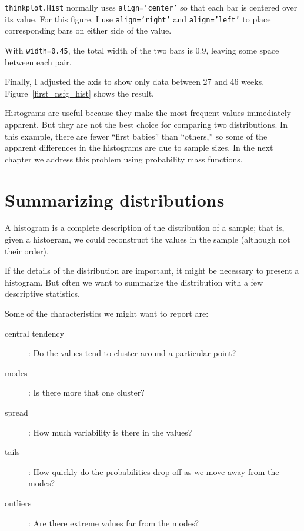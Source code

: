 \documentclass[12pt]{book}
\begin{document}
{\tt thinkplot.Hist} normally uses {\tt align='center'} so that
each bar is centered over its value.  For this figure, I use
{\tt align='right'} and {\tt align='left'} to place
corresponding bars on either side of the value.

With {\tt width=0.45}, the total width of the two bars is 0.9,
leaving some space between each pair.

Finally, I adjusted the axis to show only data between 27 and 46 weeks.
Figure~\ref{first_nsfg_hist} shows the result.

Histograms are useful because they make the most frequent values
immediately apparent.  But they are not the best choice for comparing
two distributions.  In this example, there are fewer ``first babies''
than ``others,'' so some of the apparent differences in the histograms
are due to sample sizes.  In the next chapter we address this problem
using probability mass functions.


\section{Summarizing distributions}
\label{mean}

A histogram is a complete description of the distribution of a sample;
that is, given a histogram, we could reconstruct the values in the
sample (although not their order).

If the details of the distribution are important, it might be
necessary to present a histogram.  But often we want to
summarize the distribution with a few descriptive statistics.

Some of the characteristics we might want to report are:

\begin{description}

\item[central tendency]: Do the values tend to cluster around
a particular point?

\item[modes]: Is there more that one cluster?

\item[spread]: How much variability is there in the values?

\item[tails]: How quickly do the probabilities drop off as we
move away from the modes?

\item[outliers]: Are there extreme values far from the modes?

\end{description}
\end{document}
